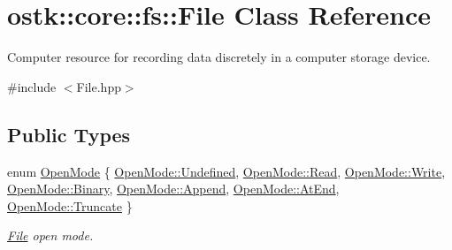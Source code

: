 \hypertarget{classostk_1_1core_1_1fs_1_1_file}{}\section{ostk\+:\+:core\+:\+:fs\+:\+:File Class Reference}
\label{classostk_1_1core_1_1fs_1_1_file}


Computer resource for recording data discretely in a computer storage device.  




{\ttfamily \#include $<$File.\+hpp$>$}

\subsection*{Public Types}
\begin{DoxyCompactItemize}
\item 
enum \hyperlink{classostk_1_1core_1_1fs_1_1_file_aef3d3e622ef15381a9f48c161e134da5}{Open\+Mode} \{ \newline
\hyperlink{classostk_1_1core_1_1fs_1_1_file_aef3d3e622ef15381a9f48c161e134da5aec0fc0100c4fc1ce4eea230c3dc10360}{Open\+Mode\+::\+Undefined}, 
\hyperlink{classostk_1_1core_1_1fs_1_1_file_aef3d3e622ef15381a9f48c161e134da5a7a1a5f3e79fdc91edf2f5ead9d66abb4}{Open\+Mode\+::\+Read}, 
\hyperlink{classostk_1_1core_1_1fs_1_1_file_aef3d3e622ef15381a9f48c161e134da5a1129c0e4d43f2d121652a7302712cff6}{Open\+Mode\+::\+Write}, 
\hyperlink{classostk_1_1core_1_1fs_1_1_file_aef3d3e622ef15381a9f48c161e134da5a6ce976e8f061b2b5cfe4d0c50c3405dd}{Open\+Mode\+::\+Binary}, 
\newline
\hyperlink{classostk_1_1core_1_1fs_1_1_file_aef3d3e622ef15381a9f48c161e134da5a3ac4692f3935a49a0b243eecf529faa9}{Open\+Mode\+::\+Append}, 
\hyperlink{classostk_1_1core_1_1fs_1_1_file_aef3d3e622ef15381a9f48c161e134da5a8d04b2d09dcc744cf134542097642db5}{Open\+Mode\+::\+At\+End}, 
\hyperlink{classostk_1_1core_1_1fs_1_1_file_aef3d3e622ef15381a9f48c161e134da5aa8156810bfee2bd2b44765b9e91db3bd}{Open\+Mode\+::\+Truncate}
 \}\begin{DoxyCompactList}\small\item\em \hyperlink{classostk_1_1core_1_1fs_1_1_file}{File} open mode. \end{DoxyCompactList}
\end{DoxyCompactItemize}
